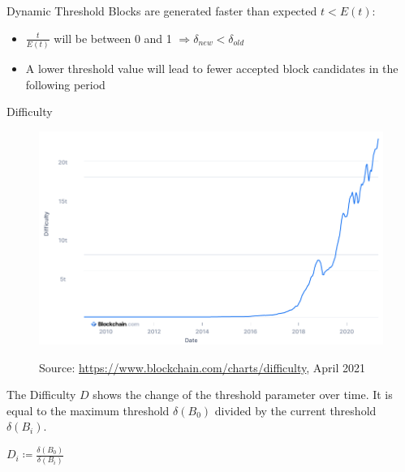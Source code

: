 \documentclass[]{beamer}
\begin{document}
\begin{frame}{Dynamic Threshold}
	Blocks are generated faster than expected $t < E(t)$:
	\begin{itemize}
		\item $\frac{t}{E(t)}$ will be between 0 and 1 $\Rightarrow \delta_{new} < \delta_{old}$
		\item A lower threshold value will lead to fewer accepted block candidates in the following period
	\end{itemize}


\end{frame}

\begin{frame}{Difficulty}
	\begin{figure}[t]
		\includegraphics[height=\textheight/2]{../assets/images/difficulty}
		
		\tiny Source: \link \url{https://www.blockchain.com/charts/difficulty}, April 2021
	\end{figure}
	
	
	
	The Difficulty $D$ shows the change of the threshold parameter over time. It is equal to the maximum threshold $\delta(B_0)$ divided by the current threshold $\delta(B_i)$.
	\begin{center}
		$D_i \coloneqq \frac{\delta(B_0)}{\delta(B_i)}$
	\end{center}
\end{frame}
\end{document}
